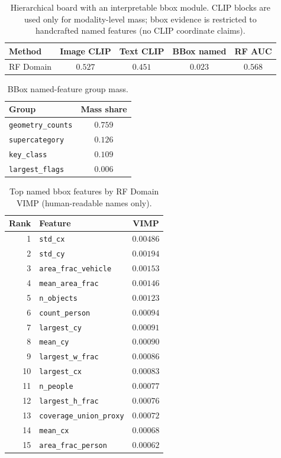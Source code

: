 
\begin{table}[ht]
\centering
\caption{Hierarchical board with an interpretable bbox module. CLIP blocks are used only for modality-level mass; bbox evidence is restricted to handcrafted named features (no CLIP coordinate claims).}
\label{tab:bbox-named-l1}
\small
\begin{tabular}{@{}l ccc c@{}}
\toprule
Method & Image CLIP & Text CLIP & BBox named & RF AUC \\
\midrule
RF Domain & $0.527$ & $0.451$ & $0.023$ & $0.568$ \\
\bottomrule
\end{tabular}
\end{table}

\begin{table}[ht]
\centering
\caption{BBox named-feature group mass.}
\label{tab:bbox-named-groups}
\small
\begin{tabular}{@{}l c@{}}
\toprule
Group & Mass share \\
\midrule
\texttt{geometry_counts} & $0.759$ \\
\texttt{supercategory} & $0.126$ \\
\texttt{key_class} & $0.109$ \\
\texttt{largest_flags} & $0.006$ \\
\bottomrule
\end{tabular}
\end{table}

\begin{table}[ht]
\centering
\caption{Top named bbox features by RF Domain VIMP (human-readable names only).}
\label{tab:bbox-named-ranking}
\small
\begin{tabular}{@{}r l c@{}}
\toprule
Rank & Feature & VIMP \\
\midrule
1 & \texttt{std\_cx} & $0.00486$ \\
2 & \texttt{std\_cy} & $0.00194$ \\
3 & \texttt{area\_frac\_vehicle} & $0.00153$ \\
4 & \texttt{mean\_area\_frac} & $0.00146$ \\
5 & \texttt{n\_objects} & $0.00123$ \\
6 & \texttt{count\_person} & $0.00094$ \\
7 & \texttt{largest\_cy} & $0.00091$ \\
8 & \texttt{mean\_cy} & $0.00090$ \\
9 & \texttt{largest\_w\_frac} & $0.00086$ \\
10 & \texttt{largest\_cx} & $0.00083$ \\
11 & \texttt{n\_people} & $0.00077$ \\
12 & \texttt{largest\_h\_frac} & $0.00076$ \\
13 & \texttt{coverage\_union\_proxy} & $0.00072$ \\
14 & \texttt{mean\_cx} & $0.00068$ \\
15 & \texttt{area\_frac\_person} & $0.00062$ \\
\bottomrule
\end{tabular}
\end{table}


